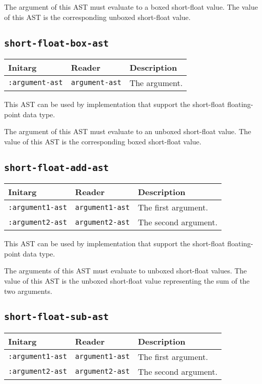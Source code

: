 The argument of this AST must evaluate to a boxed short-float value.
The value of this AST is the corresponding unboxed short-float value.

\subsection{\texttt{short-float-box-ast}}
\label{sec-ast-short-float-box}

\begin{tabular}{|l|l|l|}
\hline
Initarg & Reader & Description\\
\hline\hline
\texttt{:argument-ast} & \texttt{argument-ast} & The argument.\\
\hline
\end{tabular}

This AST can be used by implementation that support the short-float
floating-point data type.  

The argument of this AST must evaluate to an unboxed short-float
value.  The value of this AST is the corresponding boxed short-float
value.

\subsection{\texttt{short-float-add-ast}}
\label{sec-ast-short-float-add}

\begin{tabular}{|l|l|l|}
\hline
Initarg & Reader & Description\\
\hline\hline
\texttt{:argument1-ast} & \texttt{argument1-ast} & The first argument.\\
\hline
\texttt{:argument2-ast} & \texttt{argument2-ast} & The second argument.\\
\hline
\end{tabular}

This AST can be used by implementation that support the short-float
floating-point data type.  

The arguments of this AST must evaluate to unboxed short-float
values.  The value of this AST is the unboxed short-float value
representing the sum of the two arguments.

\subsection{\texttt{short-float-sub-ast}}
\label{sec-ast-short-float-sub}

\begin{tabular}{|l|l|l|}
\hline
Initarg & Reader & Description\\
\hline\hline
\texttt{:argument1-ast} & \texttt{argument1-ast} & The first argument.\\
\hline
\texttt{:argument2-ast} & \texttt{argument2-ast} & The second argument.\\
\hline
\end{tabular}

